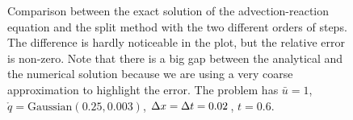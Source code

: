 \documentclass[journal,onecolumn]{IEEEtran}
\begin{document}
\begin{figure}[!ht]
	\centering

	\caption{Comparison between the exact solution of the advection-reaction equation and the split method with the two different orders of steps. The difference is hardly noticeable in the plot, but the relative error is non-zero. Note that there is a big gap between the analytical  and the numerical solution because we are using a very coarse approximation to highlight the error. The problem has $\bar{u}=1$, $\mathring{q}=\text{Gaussian}(0.25,0.003)$, $\Delta x = \Delta t = 0.02$, $t=0.6$.}
	\label{fi:AB}
\end{figure}
\end{document}
